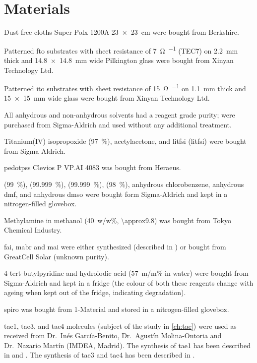 


\section{Materials}
	Dust free cloths Super Polx 1200A \SI{23x23}{\cm} were bought from Berkshire.

	Patterned \gls{fto} substrates with sheet resistance of \SI{7}{\ohm\per\sq} (TEC7) on \SI{2.2}{\mm} thick and \SI{14.8x14.8}{\mm} wide Pilkington glass were bought from Xinyan Technology Ltd.

	Patterned \gls{ito} substrates with sheet resistance of \SI{15}{\ohm\per\sq} on \SI{1.1}{\mm} thick and \SI{15x15}{\mm} wide glass were bought from Xinyan Technology Ltd.

	All anhydrous and non-anhydrous solvents had a reagent grade purity; were purchased from Sigma-Aldrich and used without any additional treatment.

	Titanium(IV) isopropoxide (97~\%), acetylacetone, and \glsdesc{litfsi} (\gls{litfsi}) were bought from Sigma-Aldrich.

	\Gls{pedotpss} Clevios P VP.AI 4083 was bought from Heraeus.

	 (99~\%),  (99.999~\%),  (99.999~\%),  (98~\%), anhydrous chlorobenzene, anhydrous \gls{dmf}, and anhydrous \gls{dmso} were bought form Sigma-Aldrich and kept in a nitrogen-filled glovebox.

	Methylamine in methanol (40~w/w\%, \SI{\approx9.8}{\Molar}) was bought from Tokyo Chemical Industry.

	\Gls{fai}, \gls{mabr} and \gls{mai} were either synthesized (described in ) or bought from GreatCell Solar (unknown purity).

	4-tert-butylpyridine and hydroiodic acid (57~m/m\% in water) were bought from Sigma-Aldrich and kept in a fridge (the colour of both these reagents change with ageing when kept out of the fridge, indicating degradation).

	\Gls{spiro} was bought from 1-Material and stored in a nitrogen-filled glovebox.

	\Gls{tae1}, \gls{tae3}, and \gls{tae4} molecules (subject of the study in \cref{ch:tae}) were used as received from Dr.\ Inés García-Benito, Dr.\ Agustín Molina-Ontoria and Dr.\ Nazario Martín (IMDEA, Madrid).
	The synthesis of \gls{tae1} has been described in  and .
	The synthesis of \gls{tae3} and \gls{tae4} has been described in .

